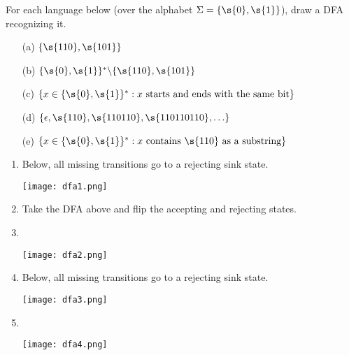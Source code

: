 \begin{flex}
\label{grp:grm:deterministic-finite-automata::draw}

\begin{gram}
\label{grm:deterministic-finite-automata::draw}
\begin{exercise}  \label{exercise:Draw-DFAs}
For each language below (over the alphabet $\Sigma = \{\s{0},\s{1}\}$), draw a DFA recognizing it.
\begin{enumerate}
    \item[(a)] $\{\s{110}, \s{101}\}$ 
    \item[(b)] $\{\s{0},\s{1}\}^* \backslash \{\s{110}, \s{101}\}$
    \item[(c)] $\{x \in \{\s{0},\s{1}\}^* : \text{$x$ starts and ends with the same bit}\}$
    \item[(d)] $\{\epsilon, \s{110}, \s{110110}, \s{110110110}, \ldots\}$
    \item[(e)] $\{x \in \{\s{0},\s{1}\}^*: \text{$x$ contains $\s{110}$ as a substring}\}$
\end{enumerate}
\end{exercise}
\begin{solution}
\begin{enumerate}[label=(\alph*)] 
    \item Below, all missing transitions go to a rejecting sink state.
    \begin{center}
        \texttt{[image: dfa1.png]}
    \end{center}
    \item Take the DFA above and flip the accepting and rejecting states.
    \item \
    \begin{center}
        \texttt{[image: dfa2.png]}
    \end{center}
    \item Below, all missing transitions go to a rejecting sink state.
    \begin{center}
        \texttt{[image: dfa3.png]}
    \end{center}
    \item \
    \begin{center}
        \texttt{[image: dfa4.png]}
    \end{center}
    \end{enumerate}
\end{solution}

\end{gram}
\end{flex}

